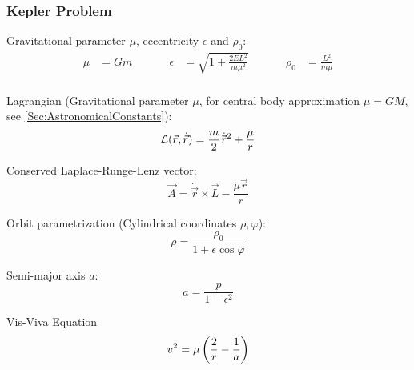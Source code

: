 		\subsubsection{Kepler Problem}
			\noindent
			Gravitational parameter  $\mu$, eccentricity $\epsilon$ and $\rho_0$:
			\begin{equation}
				\begin{aligned}
					\mu &= G m &\hspace{30pt}
					\epsilon &= \sqrt{1+\frac{2 E L^2}{m \mu^2}} &\hspace{30pt}
					\rho_0 &= \frac{L^2}{m\mu} \\
				\end{aligned}
			\end{equation}

			\noindent
			Lagrangian (Gravitational parameter $\mu$, for central body approximation $\mu=GM$, see \ref{Sec:AstronomicalConstants}):
			\begin{equation}
				\mathcal{L}(\vec{r},\dot{\vec{r}}) = \frac{m}{2} \dot{\pvec{r}}^2 + \frac{\mu}{r}
			\end{equation}

			\noindent
			Conserved Laplace-Runge-Lenz vector:%
			\begin{equation}
				\vec{A} = \dot{\vec{r}}\times\vec{L} - \frac{\mu \vec{r}}{r}
			\end{equation}

			\noindent
			Orbit parametrization (Cylindrical coordinates $\rho, \varphi$):
			\begin{equation}
				\rho = \frac{\rho_0}{1+\epsilon \cos\varphi}
			\end{equation}

			\noindent
			Semi-major axis $a$:
			\begin{equation}
				a = \frac{p}{1-\epsilon^2}
			\end{equation}

			Vis-Viva Equation
			\begin{equation}
				v^2 = \mu\left( \frac{2}{r} - \frac{1}{a} \right)
			\end{equation}
